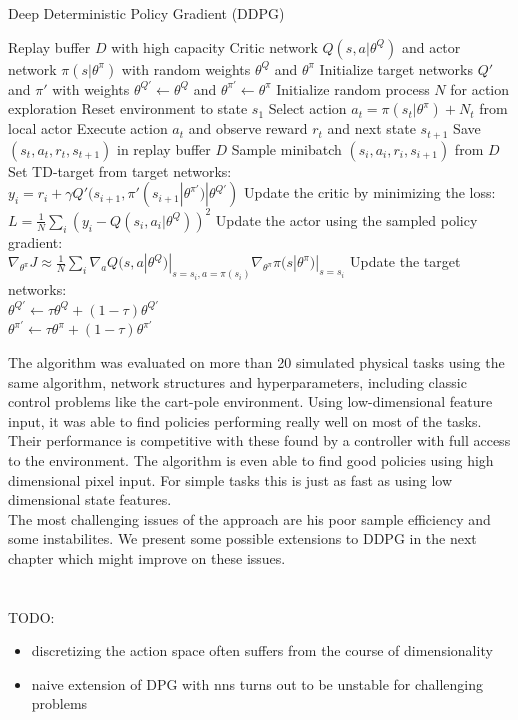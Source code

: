 \begin{algorithm}
	\caption{Deep Deterministic Policy Gradient (DDPG)}\label{DDPG-algo}
	\begin{algorithmic}
		\REQUIRE Replay buffer $\mathit{D}$ with high capacity
		\REQUIRE Critic network $Q(s,a|\theta^Q)$ and actor network $\pi(s|\theta^\pi)$ with random weights $\theta^Q$ and $\theta^\pi$
		\REQUIRE Initialize target networks $Q'$ and $\pi'$ with weights $\theta^{Q'}\leftarrow\theta^Q$ and $\theta^{\pi'}\leftarrow\theta^\pi$
		\STATE Initialize random process $\mathit{N}$ for action exploration
		\STATE Reset environment to state $s_1$
		\STATE Select action $a_t = \pi(s_t|\theta^\pi) + \mathit{N}_t$ from local actor
		\STATE Execute action $a_t$ and observe reward $r_t$ and next state $s_{t+1}$
		\STATE Save $(s_t, a_t, r_t,s_{t+1})$ in replay buffer $D$
		\STATE Sample minibatch $(s_i, a_i, r_i,s_{i+1})$ from $D$
		\STATE Set TD-target from target networks:\\
		\qquad $y_i = r_i + \gamma Q'(s_{i+1}, \pi'(s_{i+1}|\theta^{\pi'})|\theta^{Q'})$
		\STATE Update the critic by minimizing the loss:\\
		\qquad $L=\frac{1}{N}\sum_i(y_i - Q(s_i,a_i|\theta^Q))^2$
		\STATE Update the actor using the sampled policy gradient:\\ 			\qquad $\nabla_{\theta^\pi}J \approx \frac{1}{N} \sum_i \nabla_a Q(s,a|\theta^Q)|_{s=s_i, a=\pi(s_i)}\nabla_{\theta^\pi}\pi(s|\theta^\pi)|_{s=s_i}$
		\STATE Update the target networks:\\
		\qquad $\theta^{Q'}\leftarrow \tau \theta^Q + (1-\tau)\theta^{Q'}$\\
		\qquad $\theta^{\pi'}\leftarrow \tau \theta^\pi + (1-\tau)\theta^{\pi'}$
		\ENDFOR
		\ENDFOR
	\end{algorithmic}
\end{algorithm}
The algorithm was evaluated on more than 20 simulated physical tasks using the same algorithm, network structures and hyperparameters, including classic control problems like the cart-pole environment. Using low-dimensional feature input, it was able to find policies performing really well on most of the tasks. Their performance is competitive with these found by a controller with full access to the environment. The algorithm is even able to find good policies using high dimensional pixel input. For simple tasks this is just as fast as using low dimensional state features.\\
The most challenging issues of the approach are his poor sample efficiency and some instabilites. We present some possible extensions to DDPG in the next chapter which might improve on these issues.
\\
\\
\\
TODO:
\begin{itemize}
\item discretizing the action space often suffers from the course of dimensionality
\item naive extension of DPG with nns turns out to be unstable for challenging problems
\end{itemize}


